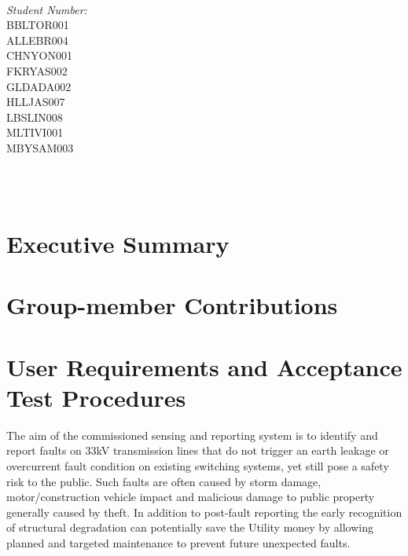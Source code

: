 \documentclass[12pt]{article}
\makeatletter
\let\thedate\@date
\makeatother
\begin{document}
\begin{titlepage}
\begin{minipage}{0.4\textwidth}
\begin{flushleft}
			\end{flushleft}
			\end{minipage}~
			\begin{minipage}{0.4\textwidth}
			\begin{flushright} \large
			\emph{Student Number:} \\
      BBLTOR001\\
      ALLEBR004\\
      CHNYON001\\
      FKRYAS002\\
      GLDADA002\\
      HLLJAS007\\
      LBSLIN008\\
      MLTIVI001\\
      MBYSAM003\\									%
		\end{flushright}
	\end{minipage}\\[0.5 cm]
	
	{\large \thedate}\\[0.5 cm]
 
	\vfill
	
\end{titlepage}


\tableofcontents
\pagebreak


\section{Executive Summary}

\section{Group-member Contributions}

\section{User Requirements and Acceptance Test Procedures}

The aim of the commissioned sensing and reporting system is to identify and report faults on 33kV transmission lines 
that do not trigger an earth leakage or overcurrent fault condition on existing switching systems, yet still pose 
a safety risk to the public. Such faults are often caused by storm damage, motor/construction vehicle impact and 
malicious damage to public property generally caused by theft. In addition to post-fault reporting the early recognition
of structural degradation can potentially save the Utility money by allowing planned and targeted maintenance to prevent 
future unexpected faults.
\end{document}
